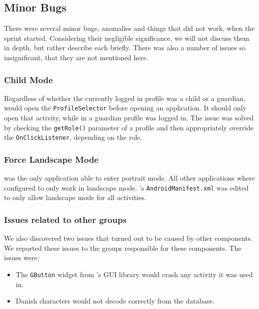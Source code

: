 \subsection{Minor Bugs}

There were several minor bugs, anomalies and things that did not work, when the sprint started.
Considering their negligible significance, we will not discuss them in depth, but rather describe each briefly.
There was also a number of issues so insignificant, that they are not mentioned here.

\subsubsection*{Child Mode}
Regardless of whether the currently logged in profile was a child or a guardian, \launcher would open the \lstinline{ProfileSelector} before opening an application.
It should only open that activity, while in a guardian profile was logged in.
The issue was solved by checking the \lstinline{getRole()} parameter of a profile and then appropriately override the \lstinline{OnClickListener}, depending on the role. 

\subsubsection*{Force Landscape Mode}
\launcher was the only application able to enter portrait mode. 
All other \giraf applications where configured to only work in landscape mode.
\launcher's \lstinline{AndroidManifest.xml} was edited to only allow landscape mode for all activities.

\subsubsection*{Issues related to other groups}
We also discovered two issues that turned out to be caused by other \giraf components. We reported these issues to the groups responsible for these components. The issues were:

\begin{itemize}
\item The \lstinline{GButton} widget from \giraf's GUI library would crash any activity it was used in.
\item Danish characters would not decode correctly from the database.
\end{itemize}
